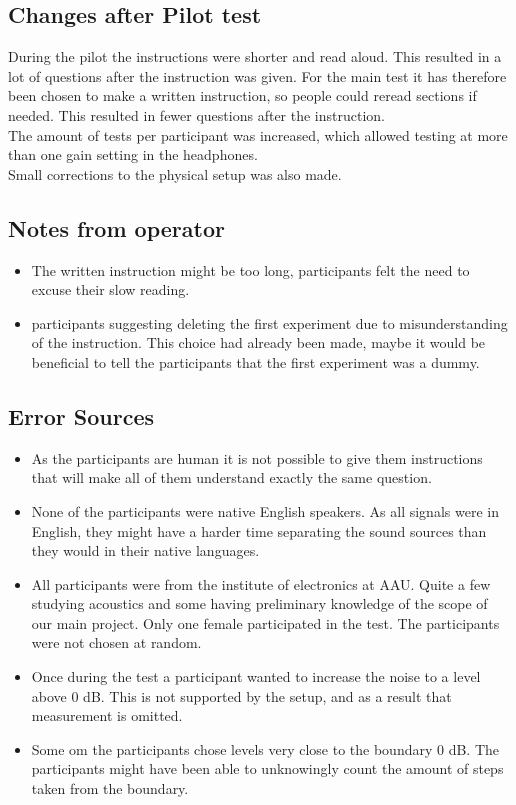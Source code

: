\subsection{Changes after Pilot test}
During the pilot the instructions were shorter and read aloud. This resulted in a lot of questions after the instruction was given. For the main test it has therefore been chosen to make a written instruction, so people could reread sections if needed. This resulted in fewer questions after the instruction. \\
The amount of tests per participant was increased, which allowed testing at more than one gain setting in the headphones. \\
Small corrections to the physical setup was also made. 

\subsection{Notes from operator}
\begin{itemize}
\item The written instruction might be too long, participants felt the need to excuse their slow reading.
\item participants suggesting deleting the first experiment due to misunderstanding of the instruction. This choice had already been made, maybe it would be beneficial to tell the participants that the first experiment was a dummy. 
\end{itemize}

\subsection{Error Sources} \label{SubSec:ErrSouNoiAtt}
\begin{itemize}
\item As the participants are human it is not possible to give them instructions that will make all of them understand exactly the same question. 
\item None of the participants were native English speakers. As all signals were in English, they might have a harder time separating the sound sources than they would in their native languages. 
\item All participants were from the institute of electronics at AAU. Quite a few studying acoustics and some having preliminary knowledge of the scope of our main project. Only one female participated in the test. The participants were not chosen at random.  
\item Once during the test a participant wanted to increase the noise to a level above 0 dB. This is not supported by the setup, and as a result that measurement is omitted.
\item Some om the participants chose levels very close to the boundary 0 dB. The participants might have been able to unknowingly count the amount of steps taken from the boundary.  
\end{itemize}

